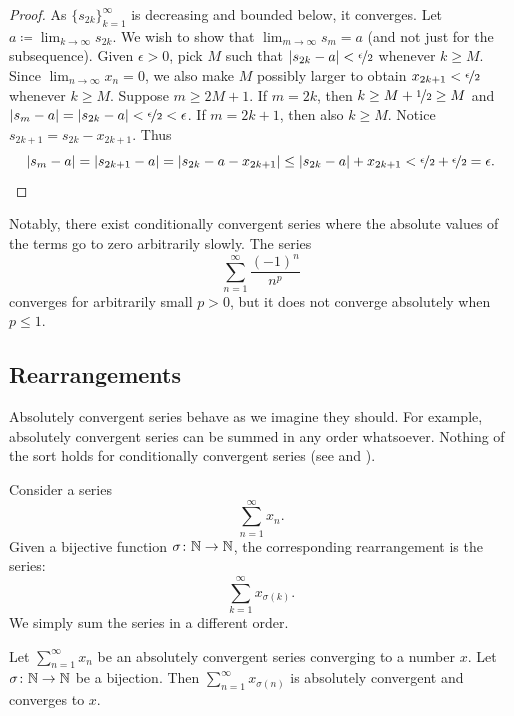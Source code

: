 \begin{proof}
As $\{ s_{2k} \}_{k=1}^\infty$ is decreasing and bounded below, it converges.
Let $a \coloneqq \lim_{k\to\infty} s_{2k}$.
We wish to show that $\lim_{m\to\infty} s_m = a$ (and not just for the subsequence).
Given $\epsilon > 0$, pick $M$ such that $\lvert {s_{2k}-a} \rvert <
\nicefrac{\epsilon}{2}$ whenever $k \geq M$.
Since $\lim_{n\to\infty} x_n = 0$, we also
make $M$ possibly larger
to obtain
$x_{2k+1} < \nicefrac{\epsilon}{2}$ whenever $k \geq M$.  
Suppose $m \geq 2M+1$.  If $m=2k$, then $k \geq M+\nicefrac{1}{2} \geq M$ and
$\lvert {s_{m}-a} \rvert=\lvert {s_{2k}-a} \rvert < \nicefrac{\epsilon}{2} < \epsilon$.
If $m=2k+1$, then also $k \geq M$.  Notice
$s_{2k+1} = s_{2k} - x_{2k+1}$.
Thus
\begin{equation*}
\lvert {s_{m}-a} \rvert = 
\lvert {s_{2k+1}-a} \rvert = 
\lvert {s_{2k}-a - x_{2k+1}} \rvert \leq
\lvert {s_{2k}-a} \rvert + x_{2k+1} < 
\nicefrac{\epsilon}{2}+ \nicefrac{\epsilon}{2} = \epsilon .  \qedhere
\end{equation*}
\end{proof}

Notably, there exist conditionally convergent series
where the absolute values of the terms go to zero arbitrarily slowly.
The series
\begin{equation*}
\sum_{n=1}^\infty \frac{{(-1)}^n}{n^p}
\end{equation*}
converges for arbitrarily small $p > 0$, but it does not converge
absolutely when $p \leq 1$.

\subsection{Rearrangements}

Absolutely convergent series behave as we imagine they should.  For example,
absolutely convergent series can be summed in any order whatsoever.  Nothing
of the sort holds for conditionally convergent series
(see 
and ).

Consider a series
\begin{equation*}
\sum_{n=1}^\infty x_n .
\end{equation*}
Given a bijective function $\sigma \colon {\mathbb{N}} \to {\mathbb{N}}$, the corresponding
rearrangement is the 
series:
\begin{equation*}
\sum_{k=1}^\infty x_{\sigma(k)} .
\end{equation*}
We simply sum the series in a different order.

\begin{prop}
Let $\sum_{n=1}^\infty x_n$ be an absolutely convergent series converging to a number
$x$.  Let $\sigma \colon {\mathbb{N}} \to {\mathbb{N}}$ be a bijection.  Then
$\sum_{n=1}^\infty x_{\sigma(n)}$ is absolutely convergent and converges to $x$.
\end{prop}

